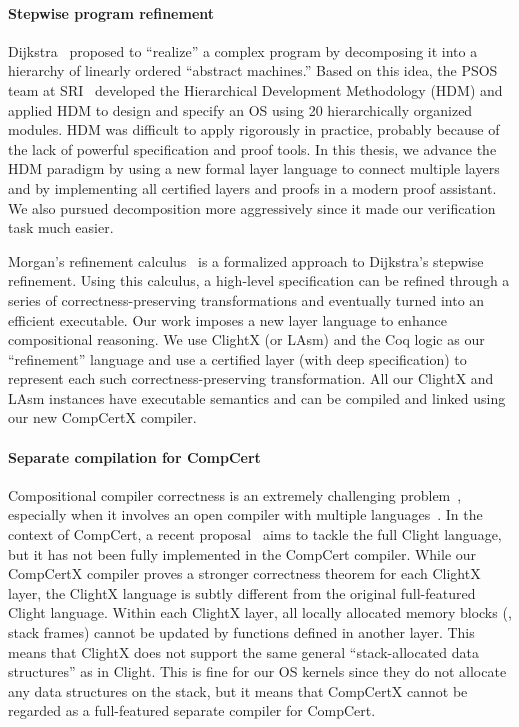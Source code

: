 \paragraph{Stepwise program refinement}
Dijkstra~\cite{Dijkstra72} proposed to ``realize'' a complex program
by decomposing it into a hierarchy of linearly ordered ``abstract
machines.''  Based on this idea, the PSOS team at SRI~\cite{psos80}
developed the Hierarchical Development Methodology (HDM) and applied
HDM to design and specify an OS using 20 hierarchically organized
modules. HDM was difficult to apply rigorously in practice,
probably because of the lack of powerful specification and proof
tools. In this thesis, we advance the HDM paradigm by using a new formal
layer language to connect multiple layers and by implementing all
certified layers and proofs in a modern proof assistant. We also
pursued decomposition more aggressively since it made our
verification task much easier.

Morgan's refinement calculus~\cite{morgan94} is a formalized approach
to Dijkstra's stepwise refinement. Using this calculus, a high-level
specification can be refined through a series of
correctness-preserving transformations and eventually turned into an
efficient executable. Our work imposes a new layer language to enhance
compositional reasoning. We use ClightX (or
LAsm) and the Coq logic as our ``refinement'' language
and use a certified layer (with deep specification)
to represent each such correctness-preserving transformation.
All our ClightX and LAsm instances have executable semantics and can be
compiled and linked using our new CompCertX compiler.

\paragraph{Separate compilation for CompCert} Compositional 
compiler correctness is an extremely challenging
problem~\cite{BentonH09,hur12}, especially when it involves an open
compiler with multiple languages~\cite{perconti14}.  In the context of
CompCert, a recent proposal~\cite{beringer14}
aims to tackle the full Clight language, but it has not been
fully implemented in the CompCert compiler.  While our CompCertX
compiler proves a stronger correctness theorem for each ClightX layer,
the ClightX language is subtly different from the original
full-featured Clight language. Within each ClightX layer, all locally
allocated memory blocks (\eg, stack frames) cannot be updated by
functions defined in another layer. This means that ClightX does not
support the same general ``stack-allocated data structures'' as in
Clight. This is fine for our OS kernels since they do not allocate any
data structures on the stack, but it means that CompCertX cannot be
regarded as a full-featured separate compiler for CompCert.


